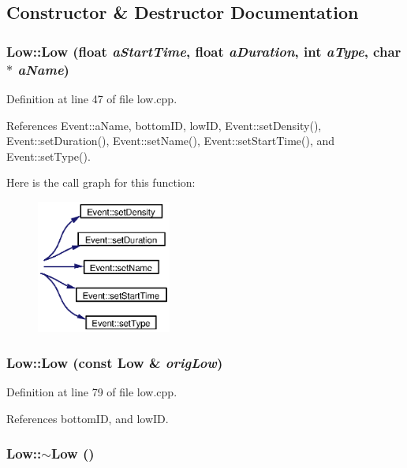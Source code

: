 \subsection{Constructor \& Destructor Documentation}
\subsubsection{\setlength{\rightskip}{0pt plus 5cm}Low::Low (float {\em a\-Start\-Time}, float {\em a\-Duration}, int {\em a\-Type}, char $\ast$ {\em a\-Name})}\label{classLow_a0}




Definition at line 47 of file low.cpp.

References Event::a\-Name, bottom\-ID, low\-ID, Event::set\-Density(), Event::set\-Duration(), Event::set\-Name(), Event::set\-Start\-Time(), and Event::set\-Type().

Here is the call graph for this function:\begin{figure}[H]
\begin{center}
\leavevmode
\includegraphics[width=125pt]{classLow_a0_cgraph}
\end{center}
\end{figure}
\subsubsection{\setlength{\rightskip}{0pt plus 5cm}Low::Low (const {\bf Low} \& {\em orig\-Low})}\label{classLow_a1}




Definition at line 79 of file low.cpp.

References bottom\-ID, and low\-ID.
\subsubsection{\setlength{\rightskip}{0pt plus 5cm}Low::$\sim${\bf Low} ()}\label{classLow_a2}




